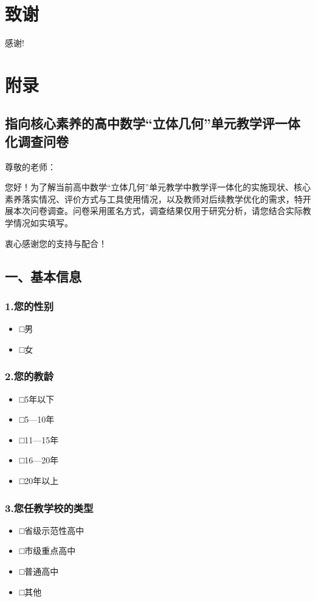 \documentclass[UTF8,a4paper,12pt,twoside]{ctexart}
\begin{document}
\section*{\centering 致\quad 谢}
感谢!
\newpage
\section*{\centering 附\quad 录}

\subsection*{指向核心素养的高中数学“立体几何”单元教学评一体化调查问卷}

尊敬的老师：

您好！为了解当前高中数学“立体几何”单元教学中教学评一体化的实施现状、核心素养落实情况、评价方式与工具使用情况，以及教师对后续教学优化的需求，特开展本次问卷调查。问卷采用匿名方式，调查结果仅用于研究分析，请您结合实际教学情况如实填写。

衷心感谢您的支持与配合！

\subsection*{一、基本信息}

\subsubsection*{1.您的性别}
\begin{itemize}
\item □男
\item □女
\end{itemize}

\subsubsection*{2.您的教龄}
\begin{itemize}
\item □5年以下
\item □5—10年
\item □11—15年
\item □16—20年
\item □20年以上
\end{itemize}

\subsubsection*{3.您任教学校的类型}
\begin{itemize}
\item □省级示范性高中
\item □市级重点高中
\item □普通高中
\item □其他
\end{itemize}
\end{document}
